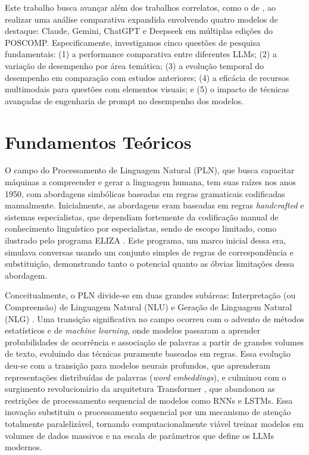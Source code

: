 \documentclass[brazilian, spanish, english]{RBIEarticle}
\begin{document}
Este trabalho busca avançar além dos trabalhos correlatos, como o de \parencite{sbsi}, ao realizar uma análise comparativa expandida envolvendo quatro modelos de destaque: Claude, Gemini, ChatGPT e Deepseek em múltiplas edições do POSCOMP. Especificamente, investigamos cinco questões de pesquisa fundamentais: (1) a performance comparativa entre diferentes LLMs; (2) a variação de desempenho por área temática; (3) a evolução temporal do desempenho em comparação com estudos anteriores; (4) a eficácia de recursos multimodais para questões com elementos visuais; e (5) o impacto de técnicas avançadas de engenharia de prompt no desempenho dos modelos.

\section{Fundamentos Teóricos}

O campo do Processamento de Linguagem Natural (PLN), que busca capacitar máquinas a compreender e gerar a linguagem humana, tem suas raízes nos anos 1950, com abordagens simbólicas baseadas em regras gramaticais codificadas manualmente. Inicialmente, as abordagens eram baseadas em regras \textit{handcrafted} e sistemas especialistas, que dependiam fortemente da codificação manual de conhecimento linguístico por especialistas, sendo de escopo limitado, como ilustrado pelo programa ELIZA \parencite{weizenbaum1966eliza}. Este programa, um marco inicial dessa era, simulava conversas usando um conjunto simples de regras de correspondência e substituição, demonstrando tanto o potencial quanto as óbvias limitações dessa abordagem.

Conceitualmente, o PLN divide-se em duas grandes subáreas: Interpretação (ou Compreensão) de Linguagem Natural (NLU) e Geração de Linguagem Natural (NLG) \parencite{caseli2024processamento}. Uma transição significativa no campo ocorreu com o advento de métodos estatísticos e de \textit{machine learning}, onde modelos passaram a aprender probabilidades de ocorrência e associação de palavras a partir de grandes volumes de texto, evoluindo das técnicas puramente baseadas em regras. Essa evolução deu-se com a transição para modelos neurais profundos, que aprenderam representações distribuídas de palavras (\textit{word embeddings}), e culminou com o surgimento revolucionário da arquitetura Transformer \parencite{vaswani2023attentionneed}, que abandonou as restrições de processamento sequencial de modelos como RNNs e LSTMs. Essa inovação substituiu o processamento sequencial por um mecanismo de atenção totalmente paralelizável, tornando computacionalmente viável treinar modelos em volumes de dados massivos e na escala de parâmetros que define os LLMs modernos.
\end{document}
